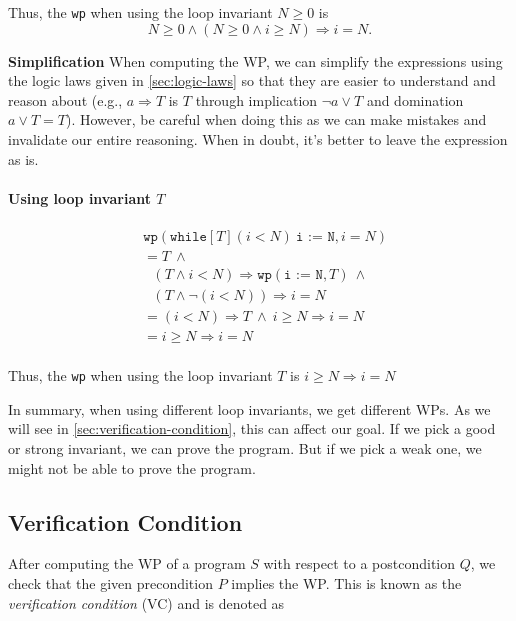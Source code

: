 \documentclass[oneside,11pt,dvipsnames]{book}
\newenvironment{commentbox}[1][]{
  \small
  \begin{mybox}
    {\small \textbf{#1}}
  }{
  \end{mybox}
}
\renewcommand{\implies}{\Rightarrow}
\newcommand{\code}[1]{\texttt{#1}}
\begin{document}
Thus, the \code{wp} when using the loop invariant $N \ge 0$ is 
\[ N \ge 0 \land (N \ge 0  \land i \ge N)  \implies i = N. \]


\begin{commentbox}{\textbf{Simplification}}
    When computing the WP, we can simplify the expressions using the logic laws given in \autoref{sec:logic-laws} so that they are easier to understand and reason about (e.g., $a \implies T$ is $T$ through implication $\neg a \lor T$ and domination $a \lor T = T$). However, be careful when doing this as we can make mistakes and invalidate our entire reasoning.  When in doubt, it's better to leave the expression as is.
\end{commentbox}


\paragraph{Using loop invariant $T$}

\begin{equation*}
    \begin{split}
        &\code{wp}(\code{while}[T] (i < N ) ~\code{i := N}, i = N)\\
    &= T ~\land  \\
    &~~~ (T \land  i < N) \implies \code{wp}(\code{i := N}, T) ~\land \\
    &~~~ (T \land \neg(i < N))  \implies i = N\\ 
    & = (i < N) \implies T ~\land~ i \ge N \implies i = N\\
    & = i \ge N \implies i = N \\
\end{split}
\end{equation*}

Thus, the \code{wp} when using the loop invariant $T$ is $i \ge N \implies i = N$


In summary, when using different loop invariants, we get different WPs. As we will see in \autoref{sec:verification-condition}, this can affect our goal.  If we pick a good or strong invariant, we can prove the program.  But if we pick a weak one, we might not be able to prove the program.



\subsection{Verification Condition}\label{sec:verification-condition} 

After computing the WP of a program $S$ with respect to a postcondition $Q$, we check that the given precondition $P$ implies the WP.  This is known as the \emph{verification condition} (VC) and is denoted as 
\end{document}
